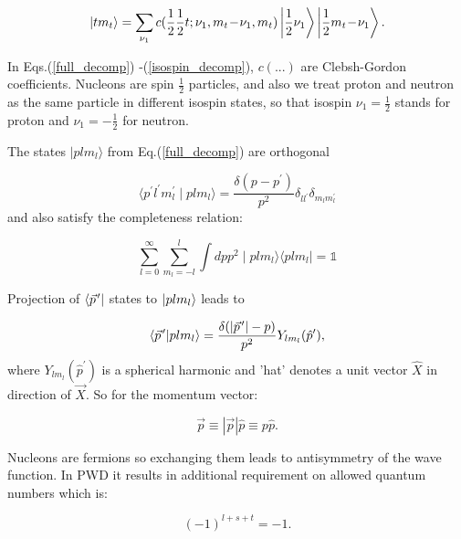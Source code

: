     \begin{equation}
        \ket{t m_t} = \sum_{\nu_1} c(\frac{1}{2}\frac{1}{2}t;\nu_1, m_t\!-\!\nu_1, m_t)
        \ket{\frac{1}{2} \nu_1}
        \ket{\frac{1}{2} m_t\!-\!\nu_1}.
        \label{isospin_decomp}
    \end{equation}

    In Eqs.(\ref{full_decomp}) -(\ref{isospin_decomp}),  $c(...)$ are Clebsh-Gordon coefficients.
    Nucleons are spin $\frac{1}{2}$ particles, and also we treat proton and neutron as 
    the same particle in different 
    isospin states, so that isospin $\nu_1 = \frac{1}{2}$ stands for proton and $\nu_1 = -\frac{1}{2}$ for neutron.

    The states $\mid p l m_l \rangle$ from Eq.(\ref{full_decomp}) are orthogonal
    
    \begin{equation}
        \langle p^\prime l^\prime m_l^\prime \mid p l m_l \rangle = 
        \frac{\delta(p - p^\prime)}{p^2} \delta_{ll^\prime}\delta_{m_l m_l^\prime}
    \end{equation}
    and also satisfy the completeness relation:

    \begin{equation}
        \sum_{l=0}^\infty \sum_{m_l=-l}^l \int dp p^2 \mid plm_l \rangle \langle plm_l \mid = \mathbb{1}
    \end{equation}


    Projection of $\bra{\pvec{p}}$ states to $\ket{plm_l}$ leads to

    \begin{equation}
        \braket{\pvec{p}}{plm_l} = 
        \frac{\delta ( \abs{\pvec{p}} - p)}{p^2} Y _{l m_l}(\hat{p}^\prime),
    \end{equation}
    where $Y _{l m_l}(\hat{p}^\prime)$ is a spherical harmonic and 'hat' denotes a unit vector $\hat{X}$ in 
    direction of $\vec{X}$. So for the momentum vector:

    \begin{equation}
        \vec{p} \equiv |\vec{p}| \hat{p} \equiv p \hat{p}. 
        \label{hat}
    \end{equation}

    Nucleons are fermions so exchanging them leads to antisymmetry of the
    wave function. In PWD it results in additional requirement on allowed quantum numbers which
    is:

    \begin{equation}
        (-1)^{l+s+t} = -1.
        \label{parity}
    \end{equation}

